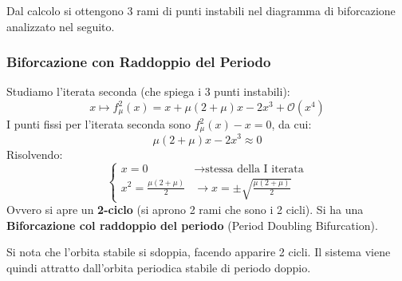 \documentclass[openany]{book}
\theoremstyle{definition}
\theoremstyle{remark}
\begin{document}
Dal calcolo si ottengono 3 rami di punti instabili nel diagramma di biforcazione analizzato nel seguito.

\subsubsection*{Biforcazione con Raddoppio del Periodo}

Studiamo l'iterata seconda (che spiega i 3 punti instabili):
$$ x \mapsto f_\mu^2(x) = x + \mu(2+\mu)x - 2x^3 + \mathcal{O}(x^4) $$
I punti fissi per l'iterata seconda sono $f_\mu^2(x) - x = 0$, da cui:
$$ \mu(2+\mu)x - 2x^3 \approx 0 $$
Risolvendo:
$$ \begin{cases} 
x = 0 & \to \text{stessa della I iterata} \\ 
x^2 = \frac{\mu(2+\mu)}{2} & \to x = \pm \sqrt{\frac{\mu(2+\mu)}{2}} 
\end{cases} $$
Ovvero si apre un \textbf{2-ciclo} (si aprono 2 rami che sono i 2 cicli). 
Si ha una \textbf{Biforcazione col raddoppio del periodo} (Period Doubling Bifurcation).

\begin{center}
\end{center}

Si nota che l'orbita stabile si sdoppia, facendo apparire 2 cicli. Il sistema viene quindi attratto dall'orbita periodica stabile di periodo doppio.
\end{document}
